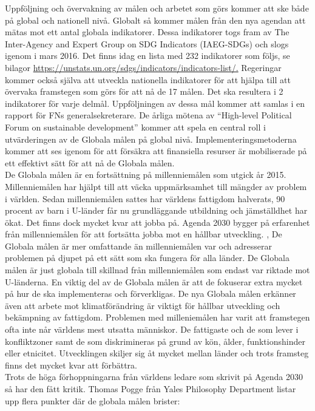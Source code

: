 \documentclass{report}
\begin{document}
Uppföljning och övervakning av målen och arbetet som görs kommer att ske både på global och nationell nivå. Globalt så kommer målen från den nya agendan att mätas mot ett antal globala indikatorer. Dessa indikatorer togs fram av The Inter-Agency and Expert Group on SDG Indicators (IAEG-SDGs) och slogs igenom i mars 2016. \cite{web2030agenda}
Det finns idag en lista med 232 indikatorer som följs, se bilagor \url {https://unstats.un.org/sdgs/indicators/indicators-list/.}
Regeringar kommer också själva att utveckla nationella indikatorer för att hjälpa till att övervaka framstegen som görs för att nå de 17 målen. Det ska resultera i 2 indikatorer för varje delmål. Uppföljningen av dessa mål kommer att samlas i en rapport för FNs generalsekreterare. De årliga mötena av  “High-level Political Forum on sustainable development” kommer att spela en central roll i utvärderingen av de Globala målen på global nivå. Implementeringsmetoderna kommer att ses igenom för att försäkra att finansiella resurser är mobiliserade på ett effektivt sätt för att nå de Globala målen.  \cite{web2030agenda}\\

De Globala målen är en fortsättning på millenniemålen som utgick år 2015. Millenniemålen har hjälpt till att väcka uppmärksamhet till mängder av problem i världen. Sedan millenniemålen sattes har världens fattigdom halverats, 90 procent av barn i U-länder får nu grundläggande utbildning och jämställdhet har ökat. Det finns dock mycket kvar att jobba på. Agenda 2030 bygger på erfarenhet från millenniemålen för att fortsätta jobba mot en hållbar utveckling. \cite{webEuropeanComission},
De Globala målen är mer omfattande än millenniemålen var och adresserar problemen på djupet på ett sätt som ska fungera för alla länder. De Globala målen är just globala till skillnad från millenniemålen som endast var  riktade mot U-länderna. En viktig del av de Globala målen är att de fokuserar extra mycket på hur de ska implementeras och förverkligas. De nya Globala målen erkänner även att arbete mot klimatförändring är viktigt för hållbar utveckling och bekämpning av fattigdom. \cite{web2030agenda}
Problemen med milleniemålen har varit att framstegen ofta inte når världens mest utsatta människor. De fattigaste och de som lever i konfliktzoner samt de som diskrimineras på grund av kön, ålder, funktionshinder eller etnicitet. Utvecklingen skiljer sig åt mycket mellan länder och trots framsteg finns det  mycket kvar att förbättra. \\

Trots de höga förhoppningarna från världens ledare som skrivit på Agenda 2030 så har den fått kritik. Thomas Pogge \cite{critique} från Yales Philosophy Department listar upp flera punkter där de globala målen brister: 
\end{document}

